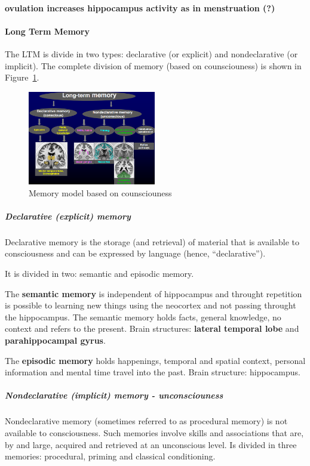 \documentclass[12pt,article,oneside,a4paper]{memoir}
\begin{document}
\paragraph{ovulation increases hippocampus activity as in menstruation (?)}

\paragraph{Long Term Memory}
The LTM is divide in two types: declarative (or explicit) and nondeclarative
(or implicit). The complete division of memory (based on counsciouness) is
shown in Figure~\ref{fig:old-memory-model}.

\begin{figure}[h]
  \centering
  \includegraphics[width=0.5\textwidth]{imgs/old-memory-model.png}
  \caption{Memory model based on counsciouness}
  \label{fig:old-memory-model}
\end{figure}

\subparagraph{Declarative (explicit) memory}
Declarative memory is the storage (and retrieval) of material that is available
to consciousness and can be expressed by language (hence, ``declarative'').

It is divided in two: semantic and episodic memory.

The \textbf{semantic memory} is independent of hippocampus and throught
repetition is possible to learning new things using the neocortex and not
passing throught the hippocampus. The semantic memory holds facts, general
knowledge, no context and refers to the present.
Brain structures: \textbf{lateral temporal lobe} and \textbf{parahippocampal
gyrus}.

The \textbf{episodic memory} holds happenings, temporal and spatial
context, personal information and mental time travel into the past.
Brain structure: hippocampus.

\subparagraph{Nondeclarative (implicit) memory - unconsciouness}
Nondeclarative memory (sometimes referred to as procedural memory) is not
available to consciousness. Such memories involve skills and associations 
that are, by and large, acquired and retrieved at an unconscious level.
Is divided in three memories: procedural, priming and classical conditioning.
\end{document}
